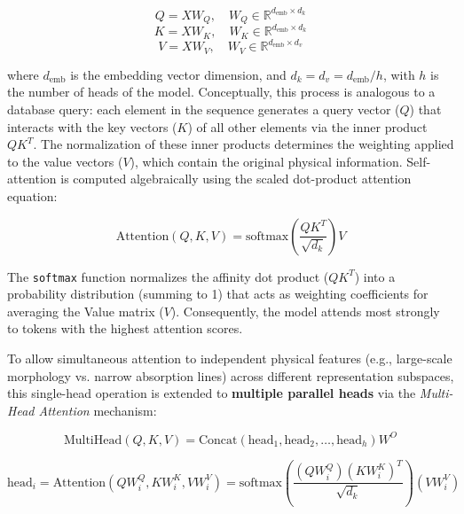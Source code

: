 \begin{equation}
Q = X W_Q, \quad W_Q \in \mathbb{R}^{d_{\text{emb}} \times d_k}
\label{eq:query_proj}
\end{equation}
\begin{equation}
K = X W_K, \quad W_K \in \mathbb{R}^{d_{\text{emb}} \times d_k}
\label{eq:key_proj}
\end{equation}
\begin{equation}
V = X W_V, \quad W_V \in \mathbb{R}^{d_{\text{emb}} \times d_v}
\label{eq:value_proj}
\end{equation}

where $d_{\text{emb}}$ is the embedding vector dimension, and $d_k=d_v=d_{\text{emb}}/h$, with $h$ is the number of heads of the model. Conceptually, this process is analogous to a database query: each element in the sequence generates a query vector ($Q$) that interacts with the key vectors ($K$) of all other elements via the inner product $Q K^T$. The normalization of these inner products determines the weighting applied to the value vectors ($V$), which contain the original physical information. Self-attention is computed algebraically using the scaled dot-product attention equation:

\begin{equation}
\text{Attention}\left(Q, K, V\right) = \text{softmax}\left(\dfrac{Q K^T}{\sqrt{d_k}}\right) V
\label{eq:attention_formula}
\end{equation}

The \texttt{softmax} function normalizes the affinity dot product ($Q K^T$) into a probability distribution (summing to 1) that acts as weighting coefficients for averaging the Value matrix ($V$). Consequently, the model attends most strongly to tokens with the highest attention scores.

To allow simultaneous attention to independent physical features (e.g., large-scale morphology vs. narrow absorption lines) across different representation subspaces, this single-head operation is extended to \textbf{multiple parallel heads} via the \textit{Multi-Head Attention} mechanism:

\begin{equation}
\text{MultiHead}\left(Q, K, V\right) = \text{Concat}\left(\text{head}_1, \text{head}_2, \dots, \text{head}_h\right) W^O
\label{eq:multihead_formula}
\end{equation}

\begin{equation}
\text{head}_i = \text{Attention}\left(Q W_i^Q, K W_i^K, V W_i^V\right) = \text{softmax}\left(\dfrac{\left(Q W_i^Q\right)\left(K W_i^K\right)^T}{\sqrt{d_k}}\right) \left(V W_i^V\right)
\label{eq:headi_formula}
\end{equation}

